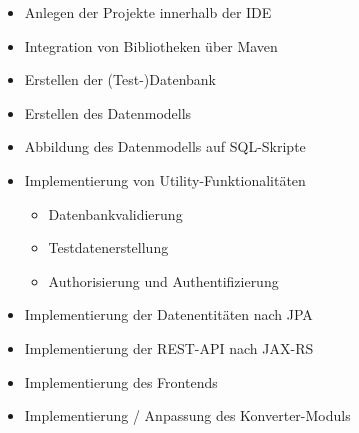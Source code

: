 \label{app:iterationsplan}

\begin{itemize}
	\item Anlegen der Projekte innerhalb der IDE
	\item Integration von Bibliotheken über Maven
	\item Erstellen der (Test-)Datenbank
	\item Erstellen des Datenmodells
	\item Abbildung des Datenmodells auf SQL-Skripte
	\item Implementierung von Utility-Funktionalitäten
	\begin{itemize}
		\item Datenbankvalidierung
		\item Testdatenerstellung
		\item Authorisierung und Authentifizierung
	\end{itemize}
	\item Implementierung der Datenentitäten nach JPA
	\item Implementierung der REST-API nach JAX-RS
	\item Implementierung des Frontends
	\item Implementierung / Anpassung des Konverter-Moduls
	
\end{itemize}
